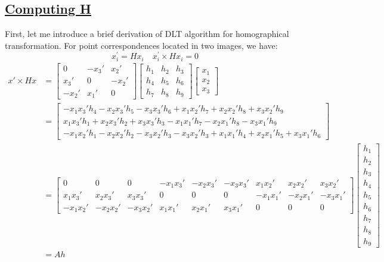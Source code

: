 \documentclass[letterpaper]{article}
\begin{document}
\subsection*{\underline{Computing H}}
First, let me introduce a brief derivation of DLT algorithm for homographical transformation. For point correspondences located in two images, we have:
$$x_i^\prime = Hx_i\quad x_i^\prime\times Hx_i = 0$$
\begin{align*}
x'\times Hx &= 
\begin{bmatrix}
0 & -x_3' & x_2'\\
x_3' & 0 & -x_2'\\
-x_2' & x_1' & 0
\end{bmatrix}
\begin{bmatrix}
h_1 & h_2 & h_3\\
h_4 & h_5 & h_6\\
h_7 & h_8 & h_9
\end{bmatrix}
\begin{bmatrix}
x_1\\
x_2\\
x_3
\end{bmatrix}\\
&= 
\begin{bmatrix}
-x_1x_3'h_4-x_2x_3'h_5-x_3x_3'h_6+x_1x_2'h_7+x_2x_2'h_8+x_3x_2'h_9\\
x_1x_3'h_1+x_2x_3'h_2+x_3x_3'h_3-x_1x_1'h_7-x_2x_1'h_8-x_3x_1'h_9\\
-x_1x_2'h_1-x_2x_2'h_2-x_3x_2'h_3-x_3x_2'h_3+x_1x_1'h_4+x_2x_1'h_5+x_3x_1'h_6
\end{bmatrix}\\
&=
\begin{bmatrix}
0 & 0 & 0 & -x_1x_3' & -x_2x_3' & -x_3x_3' & x_1x_2' & x_2x_2' & x_3x_2'\\
x_1x_3' & x_2x_3' & x_3x_3' & 0 & 0 & 0 & -x_1x_1' & -x_2x_1' & -x_3x_1'\\
-x_1x_2' & -x_2x_2' & -x_3x_2' & x_1x_1' & x_2x_1' & x_3x_1' & 0 & 0 & 0 
\end{bmatrix}
\begin{bmatrix}
h_1\\
h_2\\
h_3\\
h_4\\
h_5\\
h_6\\
h_7\\
h_8\\
h_9
\end{bmatrix}\\
&= 
Ah
\end{align*}
\end{document}
